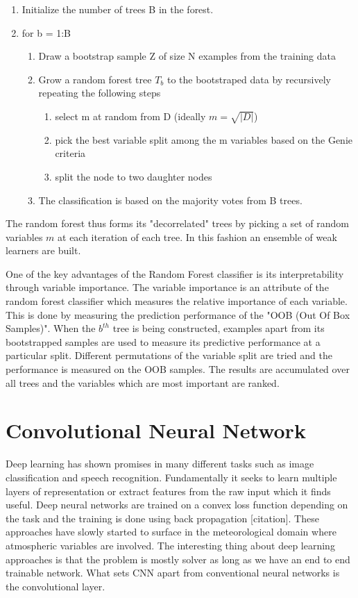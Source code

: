 \documentclass[proposal]{umassthesis}
\begin{document}
\begin{enumerate}
\item Initialize the number of trees B in the forest. 
\item for b = 1:B
\begin{enumerate}
\item Draw a bootstrap sample Z of size N examples from the training data
\item Grow a random forest tree $T_b$ to the bootstraped data by recursively repeating the following steps
\begin{enumerate}
\item select m at random from D (ideally $m = \sqrt{|D|}$)
\item pick the best variable split among the m variables based on the Genie criteria
\item split the node to two daughter nodes
\end{enumerate}
\item The classification is based on the majority votes from B trees. 
\end{enumerate}
\end{enumerate}

The random forest thus forms its "decorrelated" trees by picking a set of random variables $m$ at each iteration of each tree. In this fashion an ensemble of weak learners are built.

 One of the key advantages of the Random Forest classifier is its interpretability through variable importance. The variable importance is an attribute of the random forest classifier which measures the relative importance of each variable. This is done by measuring the prediction performance of the "OOB (Out Of Box Samples)". When the $b^{th}$ tree is being constructed, examples apart from its bootstrapped samples are used to measure its predictive performance at a particular split. Different permutations of the variable split are tried and the performance is measured on the OOB samples. The results are accumulated over all trees and the variables which are most important are ranked.
 
\section{Convolutional Neural Network}

Deep learning has shown promises in many different tasks such as image classification and speech recognition. Fundamentally it seeks to learn multiple layers of representation or extract features from the raw input which it finds useful. Deep neural networks are trained on a convex loss function depending on the task and the training is done using back propagation [citation]. These approaches have slowly started to surface in the meteorological domain where atmospheric variables are involved. The interesting thing about deep learning approaches is that the problem is mostly solver as long as we have an end to end trainable network. What sets CNN apart from conventional neural networks is the convolutional layer. 
\end{document}
